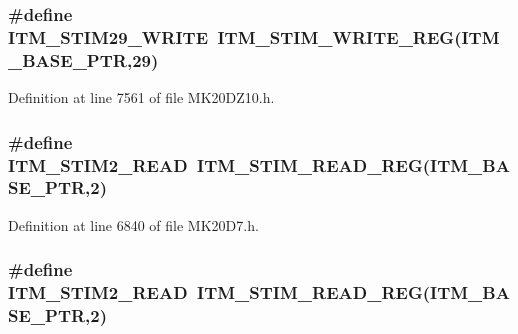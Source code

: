 \subsubsection[{\texorpdfstring{I\+T\+M\+\_\+\+S\+T\+I\+M29\+\_\+\+W\+R\+I\+TE}{ITM_STIM29_WRITE}}]{\setlength{\rightskip}{0pt plus 5cm}\#define I\+T\+M\+\_\+\+S\+T\+I\+M29\+\_\+\+W\+R\+I\+TE~{\bf I\+T\+M\+\_\+\+S\+T\+I\+M\+\_\+\+W\+R\+I\+T\+E\+\_\+\+R\+EG}({\bf I\+T\+M\+\_\+\+B\+A\+S\+E\+\_\+\+P\+TR},29)}\hypertarget{group___i_t_m___register___accessor___macros_gaf42116fa71e252ae421c078e1de7058b}{}\label{group___i_t_m___register___accessor___macros_gaf42116fa71e252ae421c078e1de7058b}


Definition at line 7561 of file M\+K20\+D\+Z10.\+h.

\subsubsection[{\texorpdfstring{I\+T\+M\+\_\+\+S\+T\+I\+M2\+\_\+\+R\+E\+AD}{ITM_STIM2_READ}}]{\setlength{\rightskip}{0pt plus 5cm}\#define I\+T\+M\+\_\+\+S\+T\+I\+M2\+\_\+\+R\+E\+AD~{\bf I\+T\+M\+\_\+\+S\+T\+I\+M\+\_\+\+R\+E\+A\+D\+\_\+\+R\+EG}({\bf I\+T\+M\+\_\+\+B\+A\+S\+E\+\_\+\+P\+TR},2)}\hypertarget{group___i_t_m___register___accessor___macros_ga34d8d4f75c9b1761c099b65fc7b2073e}{}\label{group___i_t_m___register___accessor___macros_ga34d8d4f75c9b1761c099b65fc7b2073e}


Definition at line 6840 of file M\+K20\+D7.\+h.

\subsubsection[{\texorpdfstring{I\+T\+M\+\_\+\+S\+T\+I\+M2\+\_\+\+R\+E\+AD}{ITM_STIM2_READ}}]{\setlength{\rightskip}{0pt plus 5cm}\#define I\+T\+M\+\_\+\+S\+T\+I\+M2\+\_\+\+R\+E\+AD~{\bf I\+T\+M\+\_\+\+S\+T\+I\+M\+\_\+\+R\+E\+A\+D\+\_\+\+R\+EG}({\bf I\+T\+M\+\_\+\+B\+A\+S\+E\+\_\+\+P\+TR},2)}\hypertarget{group___i_t_m___register___accessor___macros_ga34d8d4f75c9b1761c099b65fc7b2073e}{}\label{group___i_t_m___register___accessor___macros_ga34d8d4f75c9b1761c099b65fc7b2073e}


